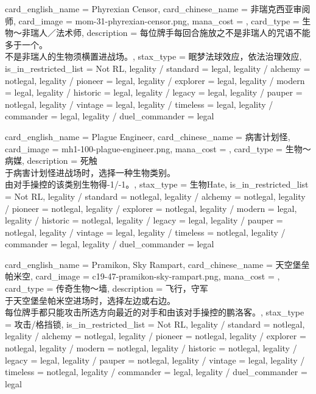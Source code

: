 \documentclass[lang = cn, color = black, 10pt]{AllThatStax}
\begin{document}
\card
{
	card_english_name = {Phyrexian Censor},
	card_chinese_name = {非瑞克西亚审阅师},
	card_image = mom-31-phyrexian-censor.png,
	mana_cost = ,
	card_type = 生物～非瑞人／法术师,
	description = {每位牌手每回合施放之不是非瑞人的咒语不能多于一个。\\
不是非瑞人的生物须横置进战场。},
	stax_type = 眠梦法球效应，依法治理效应,
	is_in_restricted_list = Not RL,
	legality / standard = legal,
	legality / alchemy = notlegal,
	legality / pioneer = legal,
	legality / explorer = legal,
	legality / modern = legal,
	legality / historic = legal,
	legality / legacy = legal,
	legality / pauper = notlegal,
	legality / vintage = legal,
	legality / timeless = legal,
	legality / commander = legal,
	legality / duel_commander = legal
}

\card
{
	card_english_name = {Plague Engineer},
	card_chinese_name = {病害计划怪},
	card_image = mh1-100-plague-engineer.png,
	mana_cost = ,
	card_type = 生物～病媒,
	description = {死触\\
于病害计划怪进战场时，选择一种生物类别。\\
由对手操控的该类别生物得-1/-1。},
	stax_type = 生物Hate,
	is_in_restricted_list = Not RL,
	legality / standard = notlegal,
	legality / alchemy = notlegal,
	legality / pioneer = notlegal,
	legality / explorer = notlegal,
	legality / modern = legal,
	legality / historic = notlegal,
	legality / legacy = legal,
	legality / pauper = notlegal,
	legality / vintage = legal,
	legality / timeless = notlegal,
	legality / commander = legal,
	legality / duel_commander = legal
}

\card
{
	card_english_name = {Pramikon, Sky Rampart},
	card_chinese_name = {天空堡垒帕米空},
	card_image = c19-47-pramikon-sky-rampart.png,
	mana_cost = ,
	card_type = 传奇生物～墙,
	description = {飞行，守军\\
于天空堡垒帕米空进场时，选择左边或右边。\\
每位牌手都只能攻击所选方向最近的对手和由该对手操控的鹏洛客。},
	stax_type = 攻击/格挡锁,
	is_in_restricted_list = Not RL,
	legality / standard = notlegal,
	legality / alchemy = notlegal,
	legality / pioneer = notlegal,
	legality / explorer = notlegal,
	legality / modern = notlegal,
	legality / historic = notlegal,
	legality / legacy = legal,
	legality / pauper = notlegal,
	legality / vintage = legal,
	legality / timeless = notlegal,
	legality / commander = legal,
	legality / duel_commander = legal
}
\end{document}
